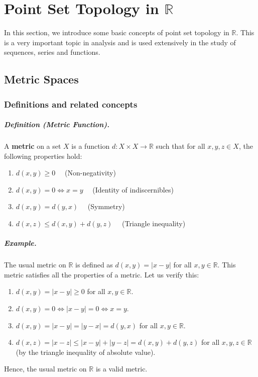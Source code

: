 \documentclass[openany]{book}
\numberwithin{equation}{section}
\begin{document}

\chapter{Point Set Topology in $\mathbb{R}$}
In this section, we introduce some basic concepts of point set topology in $\mathbb{R}$. This is a very important topic in analysis and is used extensively in the study of sequences, series and functions.
\section{Metric Spaces}
\subsection{Definitions and related concepts}
\paragraph{Definition (Metric Function).}

    A \textbf{metric} on a set $X$ is a function $d: X \times X \rightarrow \mathbb{R}$ such that for all $x, y, z \in X$, the following properties hold:
    \begin{enumerate}
        \item $d(x, y) \geq 0 \quad$ (Non-negativity)
        \item $d(x, y) = 0 \iff x = y \quad$ (Identity of indiscernibles)
        \item $d(x, y) = d(y, x) \quad$ (Symmetry)
        \item $d(x, z) \leq d(x, y) + d(y, z) \quad$ (Triangle inequality)
    \end{enumerate}
\par
\paragraph{Example.}

    The usual metric on $\mathbb{R}$ is defined as $d(x, y) = |x - y|$ for all $x, y \in \mathbb{R}$. This metric satisfies all the properties of a metric. Let us verify this:
    \begin{enumerate}
        \item $d(x, y) = |x - y| \geq 0$ for all $x, y \in \mathbb{R}$.
        \item $d(x, y) = 0 \iff |x - y| = 0 \iff x = y$.
        \item $d(x, y) = |x - y| = |y - x| = d(y, x)$ for all $x, y \in \mathbb{R}$.
        \item $d(x, z) = |x - z| \leq |x - y| + |y - z| = d(x, y) + d(y, z)$ for all $x, y, z \in \mathbb{R}$ (by the triangle inequality of absolute value).
    \end{enumerate}
    Hence, the usual metric on $\mathbb{R}$ is a valid metric.
\par
\end{document}
